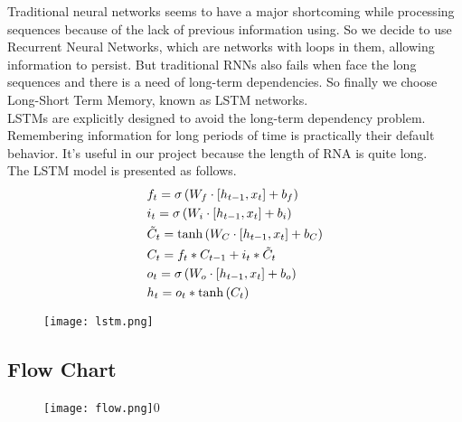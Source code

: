 \documentclass[paper=a4, fontsize=11pt] {scrartcl} %
\numberwithin{equation}{section} %
\numberwithin{figure}{section} %
\numberwithin{table}{section} %
\begin{document}
Traditional neural networks seems to have a major shortcoming while processing sequences because of the lack of previous information using. So we decide to use Recurrent Neural Networks, which are networks with loops in them, allowing information to persist. But traditional RNNs also fails when face the long sequences and there is a need of long-term dependencies. So finally we choose 
Long-Short Term Memory, known as LSTM networks.\\

LSTMs are explicitly designed to avoid the long-term dependency problem. Remembering information for long periods of time is practically their default behavior. It's useful in our project because the length of RNA is quite long. \\

The LSTM model is  presented as follows.\\

\[\begin{gathered}
  {f_t} = \sigma \left( {{W_f} \cdot \left[ {{h_{t - 1}},{x_t}} \right] + {b_f}} \right) \hfill \\
  {i_t} = \sigma \left( {{W_i} \cdot \left[ {{h_{t - 1}},{x_t}} \right] + {b_i}} \right) \hfill \\
  {{\tilde C}_t} = \tanh \left( {{W_C} \cdot \left[ {{h_{t - 1}},{x_t}} \right] + {b_C}} \right) \hfill \\
  {C_t} = {f_t} * {C_{t - 1}} + {i_t} * {{\tilde C}_t} \hfill \\
  {o_t} = \sigma \left( {{W_o} \cdot \left[ {{h_{t - 1}},{x_t}} \right] + {b_o}} \right) \hfill \\
  {h_t} = {o_t} * \tanh \left( {{C_t}} \right) \hfill \\ 
\end{gathered} \]

	\begin{figure}[htbp]
	\centering
	\texttt{[image: lstm.png]}
	\end{figure}
	
\subsection{Flow Chart}
	\begin{figure}[htbp]
	\centering
	\texttt{[image: flow.png]}0
	\end{figure}



\end{document}
